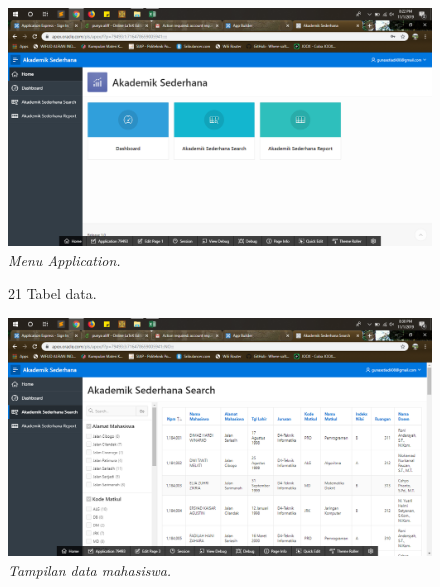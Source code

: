 \begin{enumerate}
\begin{figure}
    \begin{center}
\includegraphics[scale=0.2]{figures/g18.png}
    \caption{\textit{Menu Application.}}
        \end{center}
\label{gambar}
\end{figure}

\begin{figure}
\item[21]Tabel data.
    \begin{center}
\includegraphics[scale=0.2]{figures/g20.png} 
    \caption{\textit{Tampilan data mahasiswa.}}
        \end{center}
\label{gambar}
\end{figure}
\end{enumerate}
